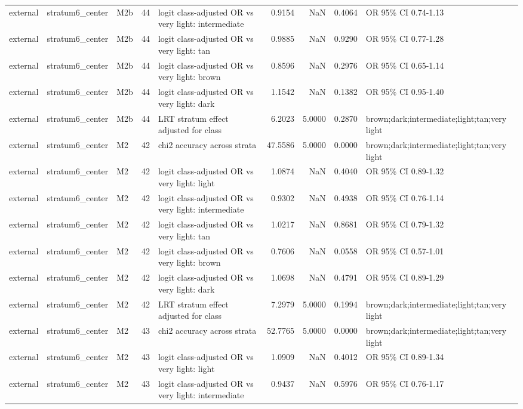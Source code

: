 \begin{tabular}{lllrlrrrl}
external & stratum6\_center & M2b & 44 & logit class-adjusted OR vs very light: intermediate & 0.9154 & NaN & 0.4064 & OR 95\% CI 0.74-1.13 \\
external & stratum6\_center & M2b & 44 & logit class-adjusted OR vs very light: tan & 0.9885 & NaN & 0.9290 & OR 95\% CI 0.77-1.28 \\
external & stratum6\_center & M2b & 44 & logit class-adjusted OR vs very light: brown & 0.8596 & NaN & 0.2976 & OR 95\% CI 0.65-1.14 \\
external & stratum6\_center & M2b & 44 & logit class-adjusted OR vs very light: dark & 1.1542 & NaN & 0.1382 & OR 95\% CI 0.95-1.40 \\
external & stratum6\_center & M2b & 44 & LRT stratum effect adjusted for class & 6.2023 & 5.0000 & 0.2870 & brown;dark;intermediate;light;tan;very light \\
external & stratum6\_center & M2 & 42 & chi2 accuracy across strata & 47.5586 & 5.0000 & 0.0000 & brown;dark;intermediate;light;tan;very light \\
external & stratum6\_center & M2 & 42 & logit class-adjusted OR vs very light: light & 1.0874 & NaN & 0.4040 & OR 95\% CI 0.89-1.32 \\
external & stratum6\_center & M2 & 42 & logit class-adjusted OR vs very light: intermediate & 0.9302 & NaN & 0.4938 & OR 95\% CI 0.76-1.14 \\
external & stratum6\_center & M2 & 42 & logit class-adjusted OR vs very light: tan & 1.0217 & NaN & 0.8681 & OR 95\% CI 0.79-1.32 \\
external & stratum6\_center & M2 & 42 & logit class-adjusted OR vs very light: brown & 0.7606 & NaN & 0.0558 & OR 95\% CI 0.57-1.01 \\
external & stratum6\_center & M2 & 42 & logit class-adjusted OR vs very light: dark & 1.0698 & NaN & 0.4791 & OR 95\% CI 0.89-1.29 \\
external & stratum6\_center & M2 & 42 & LRT stratum effect adjusted for class & 7.2979 & 5.0000 & 0.1994 & brown;dark;intermediate;light;tan;very light \\
external & stratum6\_center & M2 & 43 & chi2 accuracy across strata & 52.7765 & 5.0000 & 0.0000 & brown;dark;intermediate;light;tan;very light \\
external & stratum6\_center & M2 & 43 & logit class-adjusted OR vs very light: light & 1.0909 & NaN & 0.4012 & OR 95\% CI 0.89-1.34 \\
external & stratum6\_center & M2 & 43 & logit class-adjusted OR vs very light: intermediate & 0.9437 & NaN & 0.5976 & OR 95\% CI 0.76-1.17 \\

\end{tabular}
